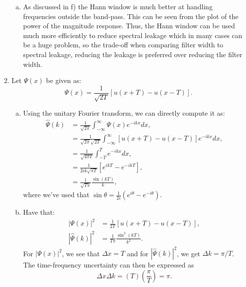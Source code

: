 \begin{enumerate}
\begin{enumerate}[a)]
          \item As discussed in f) the Hann window is much better at handling frequencies outside the band-pass.
                This can be seen from the plot of the power of the magnitude response. Thus, the Hann window 
                can be used much more efficiently to reduce spectral leakage which in many cases can 
                be a huge problem, so the trade-off when comparing filter width to spectral leakage, 
                reducing the leakage is preferred over reducing the filter width.
        \end{enumerate}

  \item Let $\Psi(x)$ be given as:
        \begin{equation*}
          \Psi(x) = \frac{1}{\sqrt{2T}}[u(x + T) - u(x - T)].
        \end{equation*}

        \begin{enumerate}[a)]
          \item Using the unitary Fourier transform, we can directly compute it as:
                \begin{align*}
                  \hat{\Psi}(k) & = \frac{1}{\sqrt{2\pi}}\int_{-\infty}^{\infty}\Psi(x)e^{-ik x}dx,                         \\
                                & = \frac{1}{\sqrt{2\pi}\sqrt{2T}}\int_{-\infty}^{\infty} [u(x + T) - u(x - T)]e^{-ik x}dx, \\
                                & = \frac{1}{\sqrt{4\pi T}}\int_{-T}^{T}e^{-ik x}dx,                                        \\
                                & = \frac{1}{2ik\sqrt{\pi T}}[e^{ik T} - e^{-ik T}],                                        \\
                                & = \frac{1}{\sqrt{T\pi}}\frac{\sin(k T)}{k},
                \end{align*}
                where we've used that $\sin\theta = \frac{1}{2i}(e^{i\theta}-e^{-i\theta})$.

          \item Have that:
                \begin{align*}
                  |\Psi(x)|^{2}       & = \frac{1}{2T}[u(x+T) - u(x-T)],             \\
                  |\hat{\Psi}(k)|^{2} & = \frac{1}{T\pi}\frac{\sin^{2}(k T)}{k^{2}}.
                \end{align*}
                For $|\Psi(x)|^{2}$, we see that $\Delta x = T$ and for $|\hat{\Psi}(k)|^{2}$, 
                we get $\Delta k =\pi/T$. The time-frequency uncertainty can then be expressed as
                \[ \Delta x\Delta k=(T)\left(\frac{\pi}{T}\right)=\pi. \]


\end{enumerate}
\end{enumerate}
